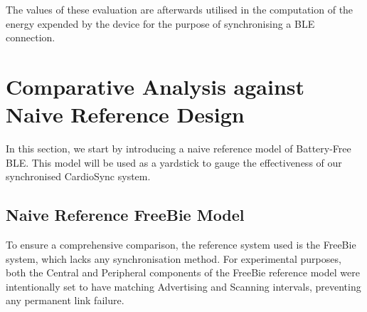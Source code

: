 \noindent The values of these evaluation are afterwards utilised in the computation of the energy expended by the device for the purpose of synchronising a BLE connection.


\section{Comparative Analysis against Naive Reference Design}
In this section, we start by introducing a naive reference model of Battery-Free BLE. This model will be used as a yardstick to gauge the effectiveness of our synchronised CardioSync system.

\subsection{Naive Reference FreeBie Model}

\noindent To ensure a comprehensive comparison, the reference system used is the FreeBie system, which lacks any synchronisation method. For experimental purposes, both the Central and Peripheral components of the FreeBie reference model were intentionally set to have matching Advertising and Scanning intervals, preventing any permanent link failure.
\vspace{1\baselineskip}

